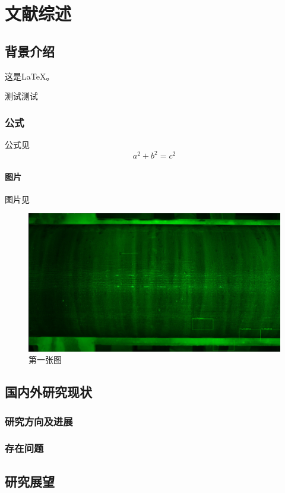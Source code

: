 \pagestyle{Content}\zhengwen
\section{文献综述}
	 	
\subsection{背景介绍}
这是\LaTeX。\cite{1}
		
\noindent 测试测试
	
\subsubsection{公式}
公式见
\begin{equation}
\label{eq:1}
a^2 + b^2 = c^2
\end{equation}
	
\paragraph{图片}

图片见

\vspace{10ex}
\begin{figure}[H]
	\includegraphics[width=\textwidth]{images/test.jpg}
	\caption{第一张图}\label{Wallpaper}
\end{figure}
	
\subsection{国内外研究现状}
	
\subsubsection{研究方向及进展}
	
\subsubsection{存在问题}
	
\subsection{研究展望}